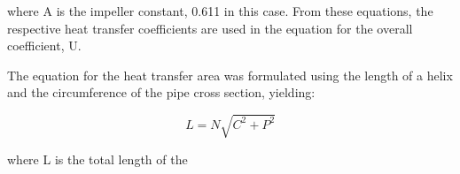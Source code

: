 where A is the impeller constant, 0.611 in this case. From these equations, the respective heat transfer coefficients are used in the equation for the overall coefficient, U.



The equation for the heat transfer area was formulated using the length of a helix and the circumference of the pipe cross section, yielding:

\begin{equation} \label{eq:energy balance}
    L = N \sqrt{C^2 + P^2}
\end{equation}

where L is the total length of the 

